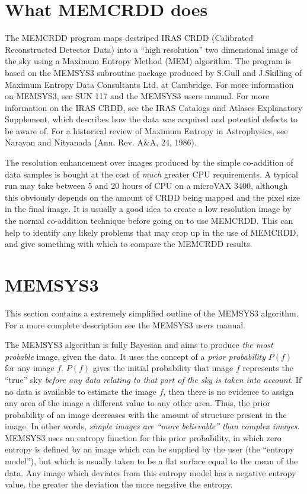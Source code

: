 \section {What MEMCRDD does}

The MEMCRDD program maps destriped IRAS CRDD (Calibrated Reconstructed Detector
Data) into a ``high resolution'' two dimensional image of the sky using a
Maximum Entropy Method (MEM) algorithm. The program is based on the MEMSYS3
subroutine package produced by S.Gull and J.Skilling of Maximum Entropy Data
Consultants Ltd. at Cambridge. For more information on MEMSYS3, see SUN 117 and
the MEMSYS3 users manual. For more information on the IRAS CRDD, see the IRAS
Catalogs and Atlases Explanatory Supplement, which describes how the data was
acquired and potential defects to be aware of. For a historical review of
Maximum Entropy in  Astrophysics, see Narayan and Nityanada (Ann. Rev. A\&A,
24, 1986).

The resolution enhancement over images produced by the simple co-addition of
data samples is bought at the cost of {\em much} greater CPU requirements. A
typical run may take between 5 and 20 hours of CPU on a microVAX 3400, 
although this obviously depends on the amount of CRDD being mapped and the
pixel size in the final image. It is usually a good idea to create a low 
resolution image by the normal co-addition technique before going on to use 
MEMCRDD. This can help to identify any likely problems that may crop up in the
use of MEMCRDD, and give something with which to compare the MEMCRDD  results.


\section {MEMSYS3}

This section contains a extremely simplified outline of the MEMSYS3 algorithm.
For a more complete description see the MEMSYS3 users manual.

The MEMSYS3 algorithm is fully Bayesian and aims to produce {\em the most
probable} image, given the data. It uses the concept of a {\em prior
probability} $P(f)$ for any image $f$. $P(f)$ gives the initial probability
that image $f$ represents the ``true'' sky {\em before any data relating to
that part of the sky is taken into account}. If no data is available to
estimate the image $f$, then there is no evidence to assign any area of the
image a different value to any other area. Thus, the prior probability of an
image decreases with the  amount of structure present in the image. In other
words, {\em simple images are  ``more believable'' than complex images}.
MEMSYS3 uses an entropy function for  this prior probability, in which zero
entropy is defined by an image which can  be supplied by the user (the
``entropy model''), but which is usually taken to  be a flat surface equal to
the mean of the data. Any image which deviates from  this entropy model has a
negative entropy value, the greater the deviation the  more negative the
entropy.

